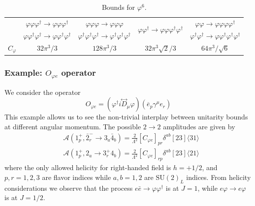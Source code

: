 \documentclass[a4paper,11pt]{article}
\begin{document}
\begin{table}[h]
\centering
\begin{tabular}{c||c|c||c|c}
\toprule
\multirow{2}{*}{}
& $\varphi\varphi\varphi^\dag\to\varphi\varphi\varphi^\dag$
& $\varphi\varphi\varphi\to\varphi\varphi\varphi$
& \multirow{2}{*}{$\varphi\varphi^\dag\to\varphi\varphi\varphi^\dag\varphi^\dag$}
& $\varphi\varphi\to\varphi\varphi\varphi\varphi^\dag$
\\
& $\varphi\varphi^\dag\varphi^\dag\to\varphi\varphi^\dag\varphi^\dag$ & $\varphi^\dag\varphi^\dag\varphi^\dag\to\varphi^\dag\varphi^\dag\varphi^\dag$ & & $\varphi^\dag\varphi^\dag\to\varphi\varphi^\dag\varphi^\dag\varphi^\dag$ \\
\hline 
$C_\varphi$& $32\pi^3/3$ & $128\pi^3/3$ & $32\pi^3\sqrt{2}/3$ & $64\pi^3/\sqrt{6}$ \\
\bottomrule
\end{tabular}
\caption{Bounds for $\varphi^6$.}
\label{tab:phi6 bounds - example}
\end{table}

\subsubsection{Example: \texorpdfstring{$O_{\varphi e}$}{x} operator}\label{sec:example OHe}
We consider the operator
\begin{equation}
    O_{\varphi e}=(\varphi^\dagger i\overset{\leftrightarrow}{D}{}_\mu \varphi)(\overline{e}_p \gamma^\mu e_r)
\end{equation}
This example allows us to see the non-trivial interplay between unitarity bounds at different angular momentum. The possible $2\to2$ amplitudes are given by
\begin{align}
    &\mathcal{A}(1_p^+,\bar{2}_r^- \to 3_a \bar{4}_b)= \frac{2}{\Lambda^2}[C_{\varphi e}]_{pr} \delta^{ab}[23]\langle31\rangle\\
    &\mathcal{A}(1_p^+,2_a \to 3_r^+ 4_b)=\frac{2}{\Lambda^2} [C_{\varphi e}]_{rp} \delta^{ab}[23]\langle21\rangle
\end{align}
where the only allowed helicity for right-handed field is $h=+1/2$, and $p,r=1,2,3$ are flavor indices while $a,b=1,2$ are $\mathrm{SU}(2)_L$ indices. From helicity considerations we observe that the process $e\bar{e}\to \varphi\varphi^\dag$ is at $J=1$, while $e\varphi\to e\varphi$ is at $J=1/2$. 
\end{document}

